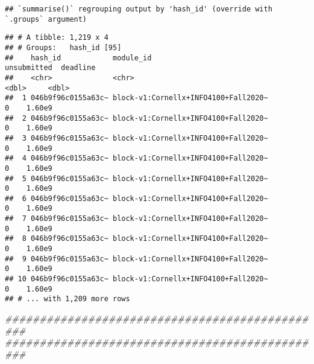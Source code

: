 \documentclass[
]{article}
\newenvironment{Shaded}{\begin{snugshade}}{\end{snugshade}}
\newcommand{\CommentTok}[1]{\textcolor[rgb]{0.56,0.35,0.01}{\textit{#1}}}
\newcommand{\DataTypeTok}[1]{\textcolor[rgb]{0.13,0.29,0.53}{#1}}
\newcommand{\KeywordTok}[1]{\textcolor[rgb]{0.13,0.29,0.53}{\textbf{#1}}}
\newcommand{\NormalTok}[1]{#1}
\newcommand{\OperatorTok}[1]{\textcolor[rgb]{0.81,0.36,0.00}{\textbf{#1}}}
\newcommand{\StringTok}[1]{\textcolor[rgb]{0.31,0.60,0.02}{#1}}
\begin{document}
\begin{verbatim}
## `summarise()` regrouping output by 'hash_id' (override with `.groups` argument)
\end{verbatim}

\begin{Shaded}
\end{Shaded}

\begin{verbatim}
## # A tibble: 1,219 x 4
## # Groups:   hash_id [95]
##    hash_id            module_id                            unsubmitted  deadline
##    <chr>              <chr>                                      <dbl>     <dbl>
##  1 046b9f96c0155a63c~ block-v1:Cornellx+INFO4100+Fall2020~           0    1.60e9
##  2 046b9f96c0155a63c~ block-v1:Cornellx+INFO4100+Fall2020~           0    1.60e9
##  3 046b9f96c0155a63c~ block-v1:Cornellx+INFO4100+Fall2020~           0    1.60e9
##  4 046b9f96c0155a63c~ block-v1:Cornellx+INFO4100+Fall2020~           0    1.60e9
##  5 046b9f96c0155a63c~ block-v1:Cornellx+INFO4100+Fall2020~           0    1.60e9
##  6 046b9f96c0155a63c~ block-v1:Cornellx+INFO4100+Fall2020~           0    1.60e9
##  7 046b9f96c0155a63c~ block-v1:Cornellx+INFO4100+Fall2020~           0    1.60e9
##  8 046b9f96c0155a63c~ block-v1:Cornellx+INFO4100+Fall2020~           0    1.60e9
##  9 046b9f96c0155a63c~ block-v1:Cornellx+INFO4100+Fall2020~           0    1.60e9
## 10 046b9f96c0155a63c~ block-v1:Cornellx+INFO4100+Fall2020~           0    1.60e9
## # ... with 1,209 more rows
\end{verbatim}

\begin{Shaded}
\begin{Highlighting}[]
\CommentTok{############################################### }
\CommentTok{############################################### }
\end{Highlighting}
\end{Shaded}
\end{document}
